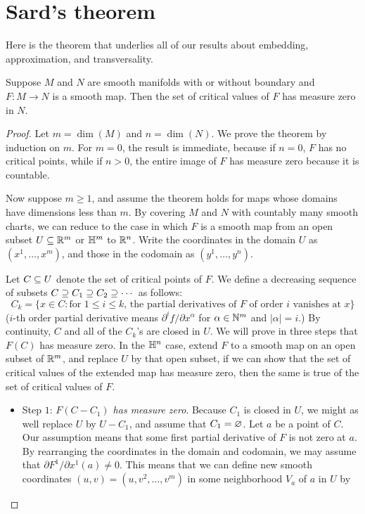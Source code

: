 \section{Sard's theorem}
Here is the theorem that underlies all of our results about embedding, approximation, and transversality.
\begin{theorem}
Suppose $M$ and $N$ are smooth manifolds with or without boundary and $F:M\to N$ is a smooth map. Then the set of critical values of $F$ has measure zero in $N$.
\end{theorem}
\begin{proof}
Let $m=\dim(M)$ and $n=\dim(N)$. We prove the theorem by induction on $m$. For $m=0$, the result is immediate, because if $n=0$, $F$ has no critical points, while if $n>0$, the entire image of $F$ has measure zero because it is countable.\par
Now suppose $m\geq 1$, and assume the theorem holds for maps whose domains have dimensions less than $m$. By covering $M$ and $N$ with countably many smooth charts, we can reduce to the case in which $F$ is a smooth map from an open subset $U\subseteq\mathbb{R}^m$ or $\mathbb{H}^m$ to $\mathbb{R}^n$. Write the coordinates in the domain $U$ as $(x^1,\dots,x^m)$, and those in the codomain as $(y^1,\dots,y^n)$.\par
Let $C\subseteq U$ denote the set of critical points of $F$. We define a decreasing sequence of subsets $C\supseteq C_1\supseteq C_2\supseteq\cdots$ as follows:
\[C_k=\{x\in C:\text{for $1\leq i\leq k$, the partial derivatives of $F$ of order $i$ vanishes at $x$}\}\]
($i$-th order partial derivative means $\partial^if/\partial x^\alpha$ for $\alpha\in\mathbb{N}^m$ and $|\alpha|=i$.) By continuity, $C$ and all of the $C_k$'s are closed in $U$. We will prove in three steps that $F(C)$ has measure zero. In the $
\mathbb{H}^n$ case, extend $F$ to a smooth map on an open subset of $\mathbb{R}^m$, and replace $U$ by that open subset, if we can show that the set of critical values of the extended map has measure zero, then the same is true of the set of critical values of $F$.
\begin{itemize}
\item Step $1$: \textit{$F(C-C_1)$ has measure zero}. Because $C_1$ is closed in $U$, we might as well replace $U$ by $U-C_1$, and assume that $C_1=\varnothing$. Let $a$ be a point of $C$. Our assumption means that some first partial derivative of $F$ is not zero at $a$. By rearranging the coordinates in the domain and codomain, we may assume that $\partial F^1/\partial x^1(a)\neq 0$. This means that we can define new smooth coordinates $(u,v)=(u,v^2,\dots,v^m)$ in some neighborhood $V_a$ of $a$ in $U$ by

\end{itemize}
\end{proof}
